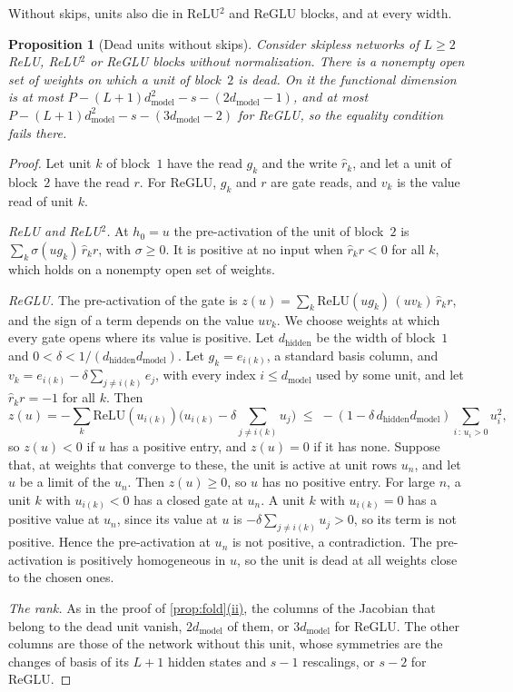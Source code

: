 \documentclass[10pt]{article}
\newtheorem{proposition}[theorem]{Proposition}
\theoremstyle{definition}
\theoremstyle{remark}
\newcommand{\dm}{d_{\mathrm{model}}}
\newcommand{\dhid}{d_{\mathrm{hidden}}}
\DeclareRobustCommand{\cpref}[2]{\hyperref[#1:#2]{\cref*{#1}(#2)}}
\begin{document}
Without skips, units also die in ReLU$^2$ and ReGLU blocks, and at every width.

\begin{proposition}[Dead units without skips]\label{prop:deadskipless}
Consider skipless networks of $L \ge 2$ ReLU, ReLU$^2$ or ReGLU blocks without normalization. There is a nonempty open set of weights on which a unit of block~$2$ is dead. On it the functional dimension is at most $P - (L+1)\dm^2 - s - (2\dm - 1)$, and at most $P - (L+1)\dm^2 - s - (3\dm - 2)$ for ReGLU, so the equality condition fails there.
\end{proposition}

\begin{proof}
Let unit $k$ of block~$1$ have the read $g_k$ and the write $\hat r_k$, and let a unit of block~$2$ have the read $r$. For ReGLU, $g_k$ and $r$ are gate reads, and $v_k$ is the value read of unit $k$.

\emph{ReLU and ReLU$^2$.} At $h_0 = u$ the pre-activation of the unit of block~$2$ is $\sum_k \sigma(ug_k)\,\hat r_kr$, with $\sigma \ge 0$. It is positive at no input when $\hat r_kr < 0$ for all $k$, which holds on a nonempty open set of weights.

\emph{ReGLU.} The pre-activation of the gate is $z(u) = \sum_k \mathrm{ReLU}(ug_k)\,(uv_k)\,\hat r_kr$, and the sign of a term depends on the value $uv_k$. We choose weights at which every gate opens where its value is positive. Let $\dhid$ be the width of block~$1$ and $0 < \delta < 1/(\dhid\dm)$. Let $g_k = e_{i(k)}$, a standard basis column, and $v_k = e_{i(k)} - \delta\sum_{j \neq i(k)}e_j$, with every index $i \le \dm$ used by some unit, and let $\hat r_kr = -1$ for all $k$. Then
\[
z(u) = -\sum_k \mathrm{ReLU}(u_{i(k)})\Big(u_{i(k)} - \delta\sum_{j \neq i(k)}u_j\Big) \;\le\; -(1 - \delta\,\dhid\dm)\sum_{i\,:\,u_i > 0}u_i^2 ,
\]
so $z(u) < 0$ if $u$ has a positive entry, and $z(u) = 0$ if it has none. Suppose that, at weights that converge to these, the unit is active at unit rows $u_n$, and let $u$ be a limit of the $u_n$. Then $z(u) \ge 0$, so $u$ has no positive entry. For large $n$, a unit $k$ with $u_{i(k)} < 0$ has a closed gate at $u_n$. A unit $k$ with $u_{i(k)} = 0$ has a positive value at $u_n$, since its value at $u$ is $-\delta\sum_{j \neq i(k)}u_j > 0$, so its term is not positive. Hence the pre-activation at $u_n$ is not positive, a contradiction. The pre-activation is positively homogeneous in $u$, so the unit is dead at all weights close to the chosen ones.

\emph{The rank.} As in the proof of \cpref{prop:fold}{ii}, the columns of the Jacobian that belong to the dead unit vanish, $2\dm$ of them, or $3\dm$ for ReGLU. The other columns are those of the network without this unit, whose symmetries are the changes of basis of its $L+1$ hidden states and $s - 1$ rescalings, or $s - 2$ for ReGLU.
\end{proof}
\end{document}
